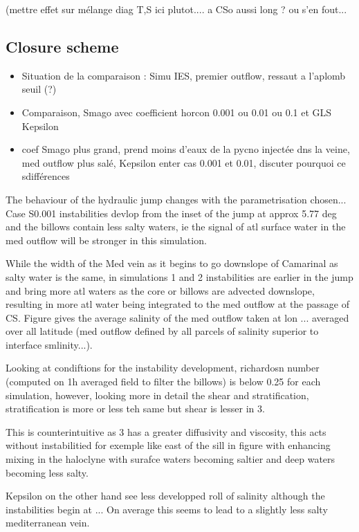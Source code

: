 (mettre effet sur mélange diag T,S ici plutot.... a CSo aussi long ? ou s'en fout...


\subsection{Closure scheme}

\begin{itemize}
\item Situation de la comparaison : Simu IES, premier outflow, ressaut a l'aplomb seuil (?)
\item Comparaison, Smago avec coefficient horcon 0.001 ou 0.01 ou 0.1  et GLS Kepsilon
\item coef Smago plus grand, prend moins d'eaux de la pycno injectée dns la veine, med outflow plus salé, Kepsilon enter cas 0.001 et 0.01, discuter pourquoi ce sdifférences
\end{itemize}

The behaviour of the hydraulic jump changes with the parametrisation chosen... Case S0.001 instabilities devlop from the inset of the jump at approx 5.77 deg and the billows contain less salty waters, ie the signal of atl surface water in the med outflow will be stronger in this simulation.


While the width of the Med vein as it begins to go downslope of Camarinal as salty water is the same, in simulations 1 and 2 instabilities are earlier in the jump and bring more atl waters as the core or billows are advected downslope, resulting in more atl water being integrated to the med outflow at the passage of CS. Figure gives the average salinity of the med outflow taken at lon ... averaged over all latitude (med outflow defined by all parcels of salinity superior to interface smlinity...).

Looking at condiftions for the instability development, richardosn number (computed on 1h averaged field to filter the billows) is below 0.25 for each simulation, however, looking more in detail the shear and stratification, stratification is more or less teh same but shear is lesser in 3.

This is counterintuitive as 3 has a greater diffusivity and viscosity, this acts without instabilitied for exemple like east of the sill in figure with enhancing mixing in the haloclyne with surafce waters becoming saltier and deep waters becoming less salty.

Kepsilon on the other hand see less developped roll of salinity although the instabilities begin at ... On average this seems to lead to a slightly less salty mediterranean vein.


